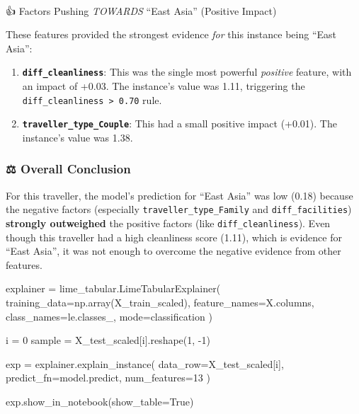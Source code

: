 \documentclass[
  letterpaper,
  DIV=11,
  numbers=noendperiod]{scrartcl}
\makeatletter
\let\oldparagraph\paragraph
\renewcommand{\paragraph}{
    \@ifstar
      \xxxParagraphStar
      \xxxParagraphNoStar
  }
\newcommand{\xxxParagraphStar}[1]{\oldparagraph*{#1}\mbox{}}
\newcommand{\xxxParagraphNoStar}[1]{\oldparagraph{#1}\mbox{}}
\newenvironment{Shaded}{\begin{snugshade}}{\end{snugshade}}
\newcommand{\DecValTok}[1]{\textcolor[rgb]{0.68,0.00,0.00}{#1}}
\newcommand{\NormalTok}[1]{\textcolor[rgb]{0.00,0.23,0.31}{#1}}
\newcommand{\OperatorTok}[1]{\textcolor[rgb]{0.37,0.37,0.37}{#1}}
\newcommand{\StringTok}[1]{\textcolor[rgb]{0.13,0.47,0.30}{#1}}
\newcommand{\VariableTok}[1]{\textcolor[rgb]{0.07,0.07,0.07}{#1}}
\providecommand{\tightlist}{%
  \setlength{\itemsep}{0pt}\setlength{\parskip}{0pt}}
\makeatother
\begin{document}
\paragraph{\texorpdfstring{👍 Factors Pushing \emph{TOWARDS} ``East
Asia'' (Positive
Impact)}{👍 Factors Pushing TOWARDS ``East Asia'' (Positive Impact)}}\label{factors-pushing-towards-east-asia-positive-impact}

These features provided the strongest evidence \emph{for} this instance
being ``East Asia'':

\begin{enumerate}
\def\labelenumi{\arabic{enumi}.}
\tightlist
\item
  \textbf{\texttt{diff\_cleanliness}}: This was the single most powerful
  \emph{positive} feature, with an impact of +0.03. The instance's value
  was 1.11, triggering the
  \texttt{diff\_cleanliness\ \textgreater{}\ 0.70} rule.
\item
  \textbf{\texttt{traveller\_type\_Couple}}: This had a small positive
  impact (+0.01). The instance's value was 1.38.
\end{enumerate}

\subsubsection{⚖️ Overall Conclusion}\label{overall-conclusion}

For this traveller, the model's prediction for ``East Asia'' was low
(0.18) because the negative factors (especially
\texttt{traveller\_type\_Family} and \texttt{diff\_facilities})
\textbf{strongly outweighed} the positive factors (like
\texttt{diff\_cleanliness}). Even though this traveller had a high
cleanliness score (1.11), which is evidence for ``East Asia'', it was
not enough to overcome the negative evidence from other features.

\begin{Shaded}
\begin{Highlighting}[]
\NormalTok{explainer }\OperatorTok{=}\NormalTok{ lime\_tabular.LimeTabularExplainer(}
\NormalTok{    training\_data}\OperatorTok{=}\NormalTok{np.array(X\_train\_scaled),}
\NormalTok{    feature\_names}\OperatorTok{=}\NormalTok{X.columns,}
\NormalTok{    class\_names}\OperatorTok{=}\NormalTok{le.classes\_,}
\NormalTok{    mode}\OperatorTok{=}\StringTok{\textquotesingle{}classification\textquotesingle{}}
\NormalTok{)}


\NormalTok{i }\OperatorTok{=} \DecValTok{0}
\NormalTok{sample }\OperatorTok{=}\NormalTok{ X\_test\_scaled[i].reshape(}\DecValTok{1}\NormalTok{, }\OperatorTok{{-}}\DecValTok{1}\NormalTok{)}


\NormalTok{exp }\OperatorTok{=}\NormalTok{ explainer.explain\_instance(}
\NormalTok{    data\_row}\OperatorTok{=}\NormalTok{X\_test\_scaled[i],}
\NormalTok{    predict\_fn}\OperatorTok{=}\NormalTok{model.predict,}
\NormalTok{    num\_features}\OperatorTok{=}\DecValTok{13}  
\NormalTok{)}

\NormalTok{exp.show\_in\_notebook(show\_table}\OperatorTok{=}\VariableTok{True}\NormalTok{)}
\end{Highlighting}
\end{Shaded}
\end{document}
